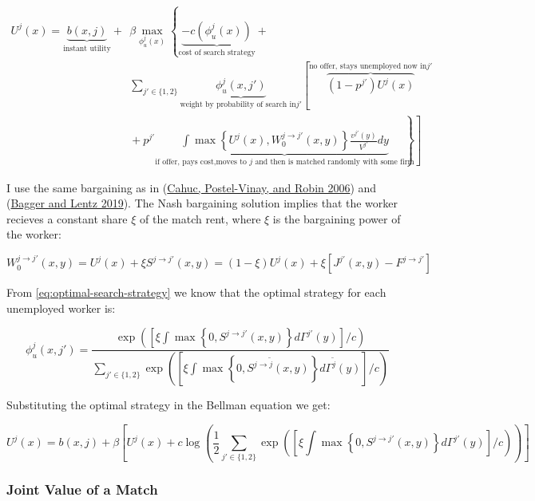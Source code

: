 \documentclass[
  letterpaper,
  DIV=11,
  numbers=noendperiod]{scrartcl}
\begin{document}
\begin{align*}
U^{j}(x) = \underbrace{b(x,j)}_{\text{instant utility}} + &\beta\max_{\phi^j_u(x)}\left\{ \underbrace{-c(\phi^j_u(x))}_{\text{cost of search strategy}} \right.  + \\
& \sum_{j'\in\{1,2\}} \underbrace{\phi^j_u(x, j')}_{\text{weight by probability of search in} j'}\left[ \overbrace{(1-p^{j'})U^{j}(x)}^{\text{no offer, stays unemployed now in} j'} \right.  \\
& \left. \left. \hspace{0cm} + p^{j'} \underbrace{\int \max\left\{U^{j}(x),W^{j\to j'}_{0}(x,y)\right\}\frac{v^{j'}(y)}{V^{j'}}dy}_{\text{if offer, pays cost,moves to } j \text{ and then is matched randomly with some firm}} \right] \right\} 
\end{align*}

I use the same bargaining as in
(\protect\hyperlink{ref-cahucWageBargainingOntheJob2006}{Cahuc,
Postel-Vinay, and Robin 2006}) and
(\protect\hyperlink{ref-baggerEmpiricalModelWage2019a}{Bagger and Lentz
2019}). The Nash bargaining solution implies that the worker recieves a
constant share \(\xi\) of the match rent, where \(\xi\) is the
bargaining power of the worker:

\[W^{j \to j'}_{0}(x,y) = U^{j}(x) + \xi S^{j\to j'}(x,y) =  (1 - \xi) U^{j}(x) + \xi [J^{j'}(x,y) - F^{j \to j'}]\]

From \eqref{eq:optimal-search-strategy} we know that the optimal
strategy for each unemployed worker is:

\begin{equation}\label{eq-optimal-search-unemployed}
\phi_{u}^{j}(x,j')=\frac{\exp{\left(\left[  \xi \int \max\left\{0, S^{j\to j'}(x,y) \right\} d\Gamma^{j'}(y) \right] / c\right)}}{\sum_{j'\in\{1,2\}}\exp{\left(\left[\xi \int \max\left\{0, S^{j\to \tilde{j} }(x,y) \right\} d\Gamma^{\tilde{j}}(y) \right] / c\right)}}
\end{equation}

Substituting the optimal strategy in the Bellman equation we get:

\begin{equation}\label{eq-bellman-unemployed}
U^{j}(x) = b(x,j) + \beta\left[U^j(x)  + c\log\left(\frac{1}{2}{\sum_{j'\in\{1,2\}}\exp{\left(\left[ \xi \int \max\left\{0, S^{j\to j' }(x,y) \right\} d\Gamma^{j'}(y) \right] / c\right)}} \right)\right]  
\end{equation}

\hypertarget{joint-value-of-a-match}{%
\subsubsection{Joint Value of a Match}\label{joint-value-of-a-match}}
\end{document}
